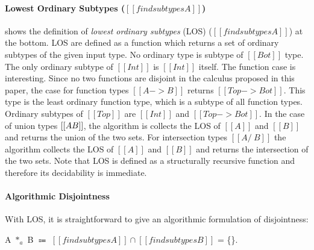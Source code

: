 
\paragraph{Lowest Ordinary Subtypes ($[[findsubtypes A]]$)}
 shows the definition of
\emph{lowest ordinary subtypes} (LOS) ($[[findsubtypes A]]$) at the bottom.
LOS are defined as a function which
returns a set of ordinary subtypes of the given input type. 
No ordinary type is subtype of $[[Bot]]$ type. The only ordinary
subtype of $[[Int]]$ is $[[Int]]$ itself. The function case is
interesting. Since no two functions are disjoint in the calculus
proposed in this paper, the case for function types $[[A -> B]]$ returns $[[Top
    -> Bot]]$. This type is the least ordinary function type, which is a subtype
of all function types.
Ordinary
subtypes of $[[Top]]$ are $[[Int]]$ and $[[Top -> Bot]]$.
In the case of union types $[[A \/ B]]$, the
algorithm is collects the LOS of $[[A]]$ and $[[B]]$ and returns the union of the
two sets. For intersection types $[[A
    /\ B]]$ the algorithm collects the LOS of $[[A]]$ and $[[B]]$
and returns the intersection of the two sets.
Note that LOS is defined as a structurally recursive function and therefore
its decidability is immediate.

\paragraph{Algorithmic Disjointness}
With LOS, it is straightforward to give an algorithmic formulation of
disjointness:

\begin{definition}
\label{def:inter:ad}
  A $*_a$ B $\Coloneqq$  $ [[findsubtypes A]] \cap [[findsubtypes B]] $ = \{\}.
\end{definition}

